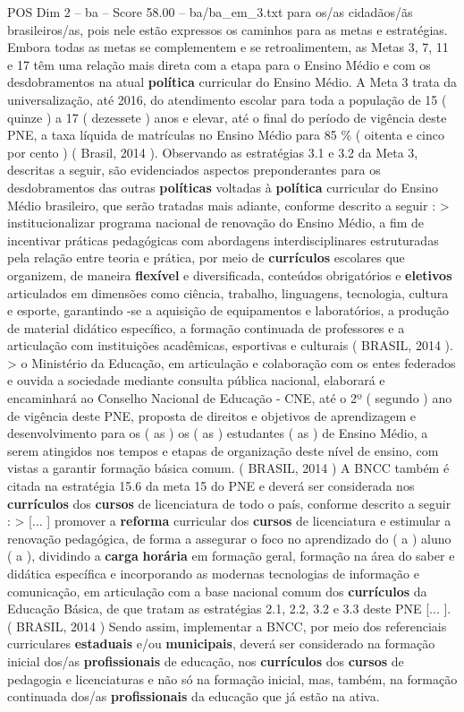 \begin{textsample}{POS Dim 2 – ba – Score 58.00 – ba/ba\_em\_3.txt}
para os/as cidadãos/ãs brasileiros/as, pois nele estão expressos os caminhos para as metas e estratégias.
Embora todas as metas se complementem e se retroalimentem, as Metas 3, 7, 11 e 17 têm uma relação mais direta com a etapa para o Ensino Médio e com os desdobramentos na atual \textbf{política} curricular do Ensino Médio.
A Meta 3 trata da universalização, até 2016, do atendimento escolar para toda a população de 15 ( quinze ) a 17 ( dezessete ) anos e elevar, até o final do período de vigência deste PNE, a taxa líquida de matrículas no Ensino Médio para 85 \% ( oitenta e cinco por cento ) ( Brasil, 2014 ).
Observando as estratégias 3.1 e 3.2 da Meta 3, descritas a seguir, são evidenciados aspectos preponderantes para os desdobramentos das outras \textbf{políticas} voltadas à \textbf{política} curricular do Ensino Médio brasileiro, que serão tratadas mais adiante, conforme descrito a seguir : > institucionalizar programa nacional de renovação do Ensino Médio, a fim de incentivar práticas pedagógicas com abordagens interdisciplinares estruturadas pela relação entre teoria e prática, por meio de \textbf{currículos} escolares que organizem, de maneira \textbf{flexível} e diversificada, conteúdos obrigatórios e \textbf{eletivos} articulados em dimensões como ciência, trabalho, linguagens, tecnologia, cultura e esporte, garantindo -se a aquisição de equipamentos e laboratórios, a produção de material didático específico, a formação continuada de professores e a articulação com instituições acadêmicas, esportivas e culturais ( BRASIL, 2014 ). > o Ministério da Educação, em articulação e colaboração com os entes federados e ouvida a sociedade mediante consulta pública nacional, elaborará e encaminhará ao Conselho Nacional de Educação - CNE, até o 2º ( segundo ) ano de vigência deste PNE, proposta de direitos e objetivos de aprendizagem e desenvolvimento para os ( as ) os ( as ) estudantes ( as ) de Ensino Médio, a serem atingidos nos tempos e etapas de organização deste nível de ensino, com vistas a garantir formação básica comum. ( BRASIL, 2014 ) A BNCC também é citada na estratégia 15.6 da meta 15 do PNE e deverá ser considerada nos \textbf{currículos} dos \textbf{cursos} de licenciatura de todo o país, conforme descrito a seguir : > [... ] promover a \textbf{reforma} curricular dos \textbf{cursos} de licenciatura e estimular a renovação pedagógica, de forma a assegurar o foco no aprendizado do ( a ) aluno ( a ), dividindo a \textbf{carga} \textbf{horária} em formação geral, formação na área do saber e didática específica e incorporando as modernas tecnologias de informação e comunicação, em articulação com a base nacional comum dos \textbf{currículos} da Educação Básica, de que tratam as estratégias 2.1, 2.2, 3.2 e 3.3 deste PNE [... ]. ( BRASIL, 2014 ) Sendo assim, implementar a BNCC, por meio dos referenciais curriculares \textbf{estaduais} e/ou \textbf{municipais}, deverá ser considerado na formação inicial dos/as \textbf{profissionais} de educação, nos \textbf{currículos} dos \textbf{cursos} de pedagogia e licenciaturas e não só na formação inicial, mas, também, na formação continuada dos/as \textbf{profissionais} da educação que já estão na ativa.

\end{textsample}
